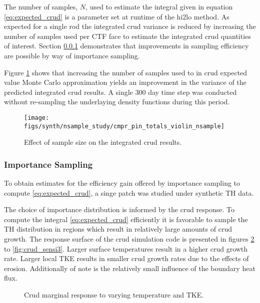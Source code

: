 The number of samples, $N$, used to estimate the integral given in equation \ref{eq:expected_crud} is a parameter set at runtime of the hi2lo method.
As expected for a single rod the integrated crud variance is reduced by increasing the number of samples used per CTF face to estimate the integrated crud quantities of interest.   Section \ref{sec:Importance Sampling} demonstrates that improvements in sampling efficiency are possible by way of importance sampling.

Figure \ref{fig:cmprpintotalsviolinnsample} shows that increasing the number of samples used to in crud expected value Monte Carlo approximation yields an improvement in the variance of the predicted integrated crud results.  A single 300 day time step was conducted without re-sampling the underlaying density functions during this period.

\begin{figure}[H]
    \centering
    \texttt{[image: figs/synth/nsample\_study/cmpr\_pin\_totals\_violin\_nsample]}
    \caption{Effect of sample size on the integrated crud results.}
    \label{fig:cmprpintotalsviolinnsample}
\end{figure}



\subsubsection{Importance Sampling}
\label{sec:Importance Sampling}

To obtain estimates for the efficiency gain offered by importance sampling to compute \ref{eq:expected_crud}, a singe patch was studied under synthetic TH data.

The choice of importance distribution is informed by the crud response.  To compute the integral \ref{eq:expected_crud} efficiently it is favorable to sample the TH distribution in regions which result in relatively large amounts of crud growth.  The response surface of the crud simulation code is presented in figures \ref{fig:crud_sensi1} to \ref{fig:crud_sensi3}.  Larger surface temperatures result in a higher crud growth rate.  Larger local TKE results in smaller crud growth rates due to the effects of erosion.  Additionally of note is the relatively small influence of the boundary heat flux.

\begin{figure}[H]%
    \centering
    \qquad
    \caption[]{Crud marginal response to varying temperature and TKE.}%
    \label{fig:crud_sensi1}%
\end{figure}

